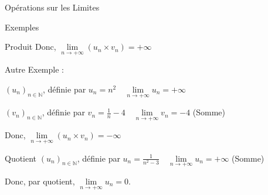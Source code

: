 \documentclass{cours}
\begin{document}
\begin{Gpartie}{Opérations sur les Limites}
\begin{Spartie}{Exemples}
\begin{SSpartie}{Produit}
                Donc, $\lim\limits_{n\to +\infty}(u_n\times v_n)=+\infty$
                
                \vspace{2ex}Autre Exemple :

                $(u_n)_{n\in\mathbb{N}}$, définie par $u_n=n^2\quad\lim\limits_{n\to +\infty}u_n=+\infty$

                $(v_n)_{n\in\mathbb{N}}$, définie par $v_n=\frac{1}{n}-4\quad\lim\limits_{n\to +\infty}v_n=-4$ (Somme)

                Donc, $\lim\limits_{n\to +\infty}(u_n\times v_n)=-\infty$
            \end{SSpartie}
            \begin{SSpartie}{Quotient} 
                $(u_n)_{n\in\mathbb{N}}$, définie par $u_n=\frac{1}{n^2-3}\quad\lim\limits_{n\to +\infty}u_n=+\infty$ (Somme)
                
                Donc, par quotient, $\lim\limits_{n\to +\infty}u_n=0$.
            \end{SSpartie}
        \end{Spartie}

    \end{Gpartie}
\end{document}

